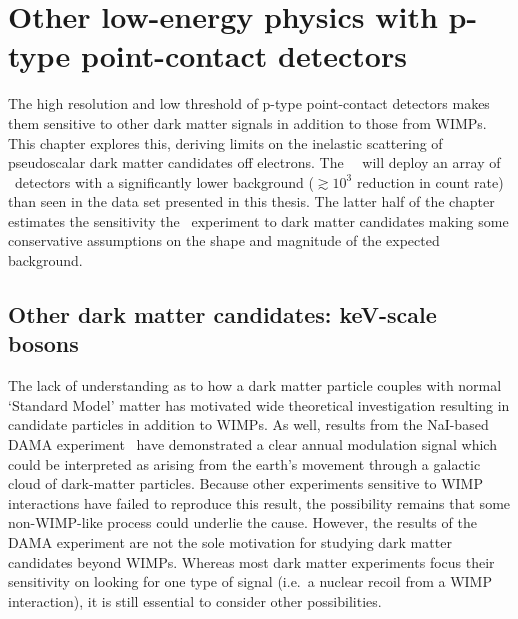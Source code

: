 \chapter{Other low-energy physics with p-type point-contact detectors}
\label{chap:OtherPhys}

	

	The high resolution and low threshold of p-type point-contact detectors makes them sensitive to other dark matter signals in addition to those from WIMPs.  This chapter explores this, deriving limits on the inelastic scattering of pseudoscalar dark matter candidates off electrons.  The \MJ~\minmod~will deploy an array of \ppc~detectors with a significantly lower background ($\gtrsim10^{3}$ reduction in count rate) than seen in the data set presented in this thesis.  The latter half of the chapter estimates the sensitivity the \MJ~experiment to dark matter candidates making some conservative assumptions on the shape and magnitude of the expected background.  
		
	\section{Other dark matter candidates: keV-scale bosons}
	\label{sec:CalcLimitsOnHeavyAxions}		

	The lack of understanding as to how a dark matter particle couples with normal `Standard Model' matter has motivated wide theoretical investigation resulting in candidate particles in addition to WIMPs.  As well, results from the NaI-based DAMA experiment~\cite{Bernabei:2005ca} have demonstrated a clear annual modulation signal which could be interpreted as arising from the earth's movement through a galactic cloud of dark-matter particles.  Because other experiments sensitive to WIMP interactions have failed to reproduce this result, the possibility remains that some non-WIMP-like process could underlie the cause.  However, the results of the DAMA experiment are not the sole motivation for studying dark matter candidates beyond WIMPs.  Whereas most dark matter experiments focus their sensitivity on looking for one type of signal (i.e.~a nuclear recoil from a WIMP interaction), it is still essential to consider other possibilities.  
	
